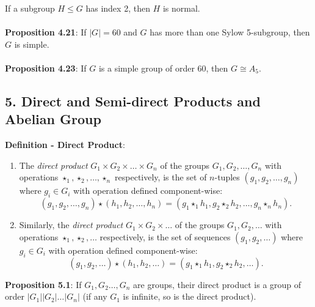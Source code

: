 \documentclass{article}
\begin{document}
If a subgroup $H \leq G$ has index 2, then $H$ is normal. \\ \\
\textbf{Proposition 4.21}: If $|G| = 60$ and $G$ has more than one Sylow 5-subgroup, then $G$ is simple. \\ \\
\textbf{Proposition 4.23}: If $G$ is a simple group of order $60$, then $G \cong A_5$.
\subsection*{5. Direct and Semi-direct Products and Abelian Group}
\textbf{Definition - Direct Product}: \begin{enumerate}
    \item The \textit{direct product} $G_1 \times G_2 \times \dots \times G_n$ of the groups $G_1, G_2, \dots, G_n$ with operations $\star_1, \star_2, \dots, \star_n$ respectively, is the set of $n$-tuples $(g_1, g_2, \dots, g_n)$ where $g_i \in G_i$ with operation defined component-wise: $$(g_1, g_2, \dots, g_n) \star (h_1, h_2, \dots, h_n) = (g_1 \star_1 h_1, g_2 \star_2 h_2, \dots, g_n \star_n h_n).$$
    \item Similarly, the \textit{direct product} $G_1 \times G_2 \times \dots$ of the groups $G_1, G_2, \dots$ with operations $\star_1, \star_2, \dots$ respectively, is the set of sequences $(g_1, g_2, \dots)$ where $g_i \in G_i$ with operation defined component-wise: $$(g_1, g_2, \dots) \star (h_1, h_2, \dots) = (g_1 \star_1 h_1, g_2 \star_2 h_2, \dots).$$
\end{enumerate} $ $ \\
\textbf{Proposition 5.1}: If $G_1, G_2 \dots, G_n$ are groups, their direct product is a group of order $|G_1||G_2| \dots |G_n|$ (if any $G_1$ is infinite, so is the direct product). \\ \\
\end{document}
